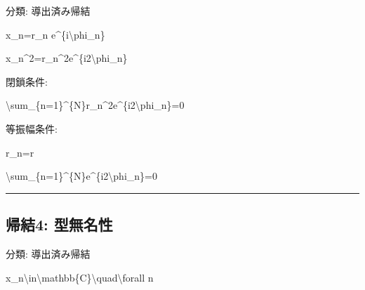 \documentclass[
  a4paper,
]{ltjsarticle}
\newenvironment{Shaded}{}{}
\newcommand{\NormalTok}[1]{#1}
\begin{document}
分類: 導出済み帰結

\begin{Shaded}
\begin{Highlighting}[]
\NormalTok{x\_n=r\_n e\^{}\{i\textbackslash{}phi\_n\}}
\end{Highlighting}
\end{Shaded}

\begin{Shaded}
\begin{Highlighting}[]
\NormalTok{x\_n\^{}2=r\_n\^{}2e\^{}\{i2\textbackslash{}phi\_n\}}
\end{Highlighting}
\end{Shaded}

閉鎖条件:

\begin{Shaded}
\begin{Highlighting}[]
\NormalTok{\textbackslash{}sum\_\{n=1\}\^{}\{N\}r\_n\^{}2e\^{}\{i2\textbackslash{}phi\_n\}=0}
\end{Highlighting}
\end{Shaded}

等振幅条件:

\begin{Shaded}
\begin{Highlighting}[]
\NormalTok{r\_n=r}
\end{Highlighting}
\end{Shaded}

\begin{Shaded}
\begin{Highlighting}[]
\NormalTok{\textbackslash{}sum\_\{n=1\}\^{}\{N\}e\^{}\{i2\textbackslash{}phi\_n\}=0}
\end{Highlighting}
\end{Shaded}

\begin{center}\rule{0.5\linewidth}{0.5pt}\end{center}

\subsection{帰結4:
型無名性}\label{ux5e30ux7d504-ux578bux7121ux540dux6027}

分類: 導出済み帰結

\begin{Shaded}
\begin{Highlighting}[]
\NormalTok{x\_n\textbackslash{}in\textbackslash{}mathbb\{C\}\textbackslash{}quad\textbackslash{}forall n}
\end{Highlighting}
\end{Shaded}
\end{document}
